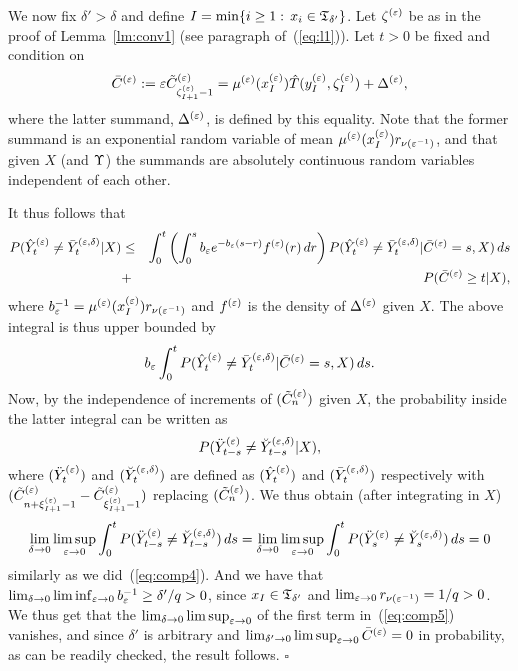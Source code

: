We now fix $\delta'>\delta$ and define $I=\min\{i\geq1:\,x_i\in{\mathfrak T}_{\delta'}\}$.  
Let $\zeta^{(\varepsilon)}$ be as in the proof of Lemma~\ref{lm:conv1} (see paragraph of~(\ref{eq:l1})). %
%
Let $t>0$ be fixed and condition on 
\begin{equation}
\label{eq:barc}
\bar C^{(\eps)}:=\eps\bce_{\zeta^{(\eps)}_{I+1}-1}=\mue(x_I^{(\eps)})\hat T(\yep_I,\ze_I)+\Delta^{(\eps)},
\end{equation} 
where the latter summand, $\Delta^{(\varepsilon)}$, is defined by this equality. %
Note that the former summand is an exponential
random variable of mean $\mu^{(\varepsilon)}(x_I^{(\varepsilon)}) r_{\nu(\varepsilon^{-1})}$, and that
given $X$  (and $\Upsilon$) the summands are 
absolutely continuous random variables independent of each other. 

It thus follows that
\begin{eqnarray}\nn
P(\hye_t\ne\vyed_t|X)&\leq&
\int_0^t\left(\int_0^sb_\eps e^{-b_\eps(s-r)}f^{(\eps)}(r)\,dr\right)P(\hye_{t}\ne\vyed_{t}|\bar C^{(\eps)}=s,X)\,ds\\
\label{eq:comp5}
&+&P(\bar C^{(\eps)}\geq t|X),
\end{eqnarray}
where $b_\varepsilon^{-1}=\mu^{(\varepsilon)}(x_I^{(\varepsilon)}) r_{\nu(\varepsilon^{-1})}$ and $f^{(\varepsilon)}$ is the density of $\Delta^{(\varepsilon)}$ given $X$. 
The above integral is thus upper bounded by
\begin{equation}
\label{eq:comp6}
b_\eps\int_0^tP(\hye_{t}\ne\vyed_{t}|\bar C^{(\eps)}=s,X)\,ds.
\end{equation}
Now, by the independence of increments of $(\tilde C^{(\varepsilon)}_n)$ given $X$, the probability inside the latter integral can be written as 
\begin{equation}
\label{eq:comp7}
P(\ddye_{t-s}\ne\bryed_{t-s}|X),
\end{equation}
where $(\ddot Y^{(\varepsilon)}_t)$ and $(\breve Y^{(\varepsilon,\delta)}_t)$ are defined as $(\hat Y^{(\varepsilon)}_{t})$ and $(\bar Y^{(\varepsilon,\delta)}_{t})$ respectively with 
$(\tilde C^{(\varepsilon)}_{n+\xi^{(\varepsilon)}_{I+1}-1}-\tilde C^{(\varepsilon)}_{\xi^{(\varepsilon)}_{I+1}-1})$ replacing $(\tilde C^{(\varepsilon)}_n)$. We thus obtain 
(after integrating in $X$)
\begin{equation}
\label{eq:comp8} 
\lim_{\delta\to0}\limsup_{\eps\to0}\int_0^tP(\ddye_{t-s}\ne\bryed_{t-s})\,ds
=\lim_{\delta\to0}\limsup_{\eps\to0}\int_0^tP(\ddye_{s}\ne\bryed_{s})\,ds=0
\end{equation}
similarly as we did~(\ref{eq:comp4}). 
And we have that $\lim_{\delta\to0}\liminf_{\varepsilon\to0}b_\varepsilon^{-1}\geq \delta'/q>0$, 
since $x_I\in{\mathfrak T}_{\delta'}$ and $\lim_{\varepsilon\to0}r_{\nu(\varepsilon^{-1})}=1/q>0$. 
We thus get that the 
$\lim_{\delta\to0}\limsup_{\varepsilon\to0}$ of the 
first term in~(\ref{eq:comp5}) vanishes, and since $\delta'$ is arbitrary and 
$\lim_{\delta'\to0}\limsup_{\varepsilon\to0}\bar C^{(\varepsilon)}=0$ in probability, 
as can be readily checked, the result follows.
$\square$

